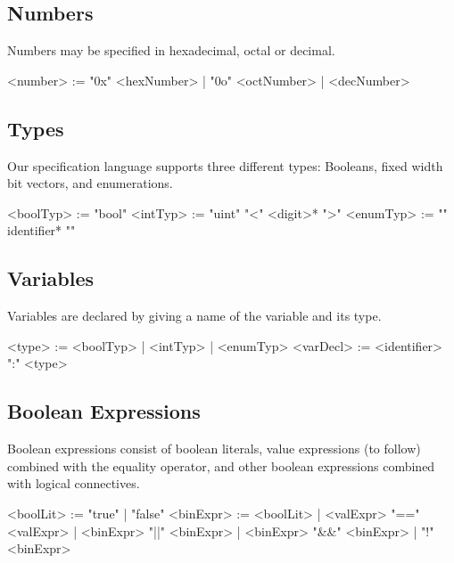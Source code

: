 \subsection{Numbers}

Numbers may be specified in hexadecimal, octal or decimal.

\begin{bnflisting}
    <number>    := "0x" <hexNumber>
                 | "0o" <octNumber>
                 | <decNumber>
\end{bnflisting}

\subsection{Types}

Our specification language supports three different types: Booleans, fixed width bit vectors, and enumerations.

\begin{bnflisting}
    <boolTyp>  := "bool"
    <intTyp>   := "uint" "<" <digit>* ">"
    <enumTyp>  := "{" identifier* "}"
\end{bnflisting}

\subsection{Variables}

Variables are declared by giving a name of the variable and its type.

\begin{bnflisting}
    <type>     := <boolTyp> | <intTyp> | <enumTyp>
    <varDecl>  := <identifier> ":" <type>
\end{bnflisting}

\subsection{Boolean Expressions}

Boolean expressions consist of boolean literals, value expressions (to follow) combined with the equality operator, and other boolean expressions combined with logical connectives.

\begin{bnflisting}
    <boolLit>  := "true" | "false"
    <binExpr>  := <boolLit> 
                | <valExpr> "==" <valExpr> 
                | <binExpr> "||" <binExpr> 
                | <binExpr> "&&" <binExpr> 
                | "!" <binExpr>
\end{bnflisting}

